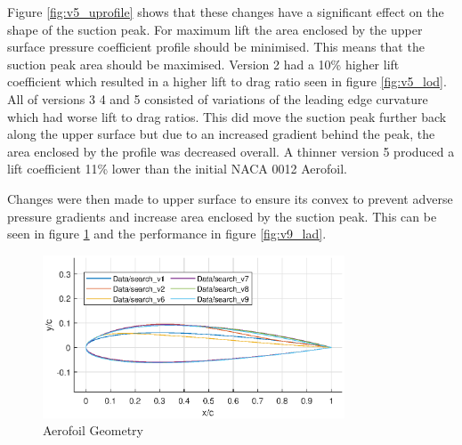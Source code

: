 \documentclass{article}
\begin{document}
Figure \ref{fig:v5_uprofile} shows that these changes have a significant effect on the shape of the suction peak.
For maximum lift the area enclosed by the upper surface pressure coefficient profile should be minimised.
This means that the suction peak area should be maximised.
Version 2 had a 10\% higher lift coefficient which resulted in a higher lift to drag ratio seen in figure \ref{fig:v5_lod}.
All of versions 3 4 and 5 consisted of variations of the leading edge curvature which had worse lift to drag ratios.
This did move the suction peak further back along the upper surface but due to an increased gradient behind the peak,
the area enclosed by the profile was decreased overall.
A thinner version 5 produced a lift coefficient 11\% lower than the initial NACA 0012 Aerofoil.

Changes were then made to upper surface to ensure its convex to prevent adverse pressure gradients and increase area enclosed by the suction peak.
This can be seen in figure \ref{fig:v9_geometry} and the performance in figure \ref{fig:v9_lad}.

\begin{figure}[H]
    \centering
    \includegraphics[width=0.8\textwidth]{figures/hiRe_geometry_9.eps}
    \caption{Aerofoil Geometry}
    \label{fig:v9_geometry}
\end{figure}
\end{document}
